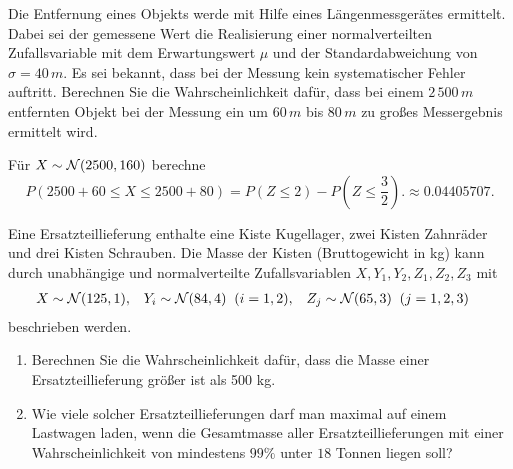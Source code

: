  Die Entfernung eines Objekts werde mit Hilfe
eines Längenmessgerätes ermittelt. Dabei sei der gemessene Wert die Realisierung
einer normalverteilten Zufallsvariable mit dem Erwartungswert $\mu$ und der
Standardabweichung von $\sigma = 40\,m$. Es sei bekannt, dass bei der Messung
kein systematischer Fehler auftritt. Berechnen Sie die Wahrscheinlichkeit
dafür, dass bei einem $2\,500\,m$ entfernten Objekt bei der Messung ein um
$60\,m$ bis $80\,m$ zu großes Messergebnis ermittelt wird. 

\solution Für $X \sim \mathcal N(2500, 160)$ berechne 
\begin{equation*}
    P(2500 + 60 \leq X \leq 2500 + 80) = P(Z \leq 2) - P(Z \leq \frac{3}{2}).
        \approx 0.04405707.
\end{equation*}


%

 Eine Ersatzteillieferung enthalte eine Kiste
Kugellager, zwei Kisten Zahnräder und drei Kisten Schrauben.  Die Masse der
Kisten (Bruttogewicht in kg) kann durch unabhängige und normalverteilte
Zufallsvariablen $X, Y_1, Y_2, Z_1, Z_2, Z_3$ mit
\begin{align*}
    X&\sim \mathcal N(125, 1), & Y_i&\sim \mathcal N(84, 4)\;\;(i=1,2), & Z_j&\sim \mathcal N(65, 3)\;\; (j=1,2,3)
\end{align*}
beschrieben werden.
\begin{enumerate}
    \item Berechnen Sie die Wahrscheinlichkeit dafür, dass die Masse einer
        Ersatzteillieferung größer ist als 500 kg.

    \item Wie viele solcher Ersatzteillieferungen darf man maximal auf einem
        Lastwagen laden, wenn die Gesamtmasse aller Ersatzteillieferungen mit
        einer Wahrscheinlichkeit von mindestens $99\%$ unter $18$ Tonnen liegen
        soll?
\end{enumerate}

